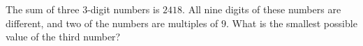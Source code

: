 The sum of three $3$-digit numbers is $2418$. All nine digits of these numbers are different, and two of the numbers are multiples of $9$. What is the smallest possible value of the third number?
